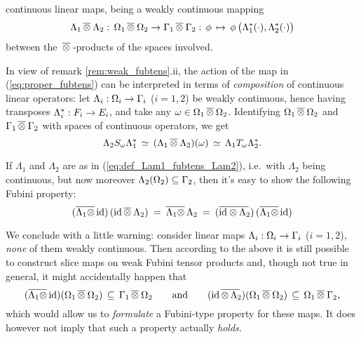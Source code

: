 \begin{remarks_chp}
  continuous linear maps, being a weakly continuous mapping
  \begin{equation} \label{eq:proper_fubtens}
    \Lambda_1 \fubtens \Lambda_2:\,
         \Om_1 \fubtens \Om_2 \rarr \Gamma_1 \fubtens \Gamma_2 :\,
         \phi \,\mapsto\, \phi\left(\Lambda_1^*(\cdot), \Lambda_2^*(\cdot)\vertM\right)
  \end{equation}
  between the $\fubtens$-products of the spaces involved.
\item
  In view of remark \ref{rem:weak_fubtens}.ii, the action of the map in
  (\ref{eq:proper_fubtens}) can be interpreted in terms of
  {\em composition\/} of continuous linear operators:
  let $\Lambda_i: \Om_i \rarr \Gamma_i$ ($i=1,2$) be weakly continuous,
  hence having transposes $\Lambda_i^*: F_i \rarr E_i$,
  and take any $\om \in \Om_1 \fubtens \Om_2$\@.
  Identifying $\Om_1 \fubtens \Om_2$ and $\Gamma_1 \fubtens \Gamma_2$
  with spaces of continuous operators, we get
  $$ \Lambda_2 S_\om \Lambda_1^*
         \,\simeq\, (\Lambda_1 \fubtens \Lambda_2)(\om)
         \,\simeq\, \Lambda_1 T_\om \Lambda_2^*.         $$
\item
  If $\Lambda_1$ and $\Lambda_2$ are as in (\ref{eq:def_Lam1_fubtens_Lam2}),
  i.e.\ with $\Lambda_2$ being continuous, but now moreover
  $\Lambda_2(\Om_2) \subseteq \Gamma_2$, then it's easy to show
  the following Fubini property:
  $$      (\overline{\Lambda_1 \tens} \,\id)\,(\id \fubtens \Lambda_2)
    \:=\: \overline{\Lambda_1 \tens} \, \Lambda_2
    \:=\: (\overline{\id \tens \Lambda_2\!}\,) \,(\overline{\Lambda_1 \tens}\,\id)$$
\item
  We conclude with a little warning:
  consider linear maps $\Lambda_i: \Om_i \rarr \Gamma_i$ ($i=1,2$),
  {\em none\/} of them weakly continuous. Then according to the
  above it is still possible to construct slice maps on weak
  Fubini tensor products and, though not true in general, it might
  accidentally happen that
  $$ (\overline{\Lambda_1 \tens} \,\id)(\Om_1 \fubtens \Om_2)
            \,\subseteq\, \Gamma_1 \fubtens \Om_2
  \andspace{2em}
     (\id \,\overline{\tens \,\Lambda_2\!}\,)(\Om_1 \fubtens \Om_2)
            \,\subseteq\, \Om_1 \fubtens \Gamma_2, $$
  which would allow us to {\em formulate\/} a Fubini-type property for these maps.
  It does however not imply that such a property actually {\em holds.}
\end{remarks_chp}

